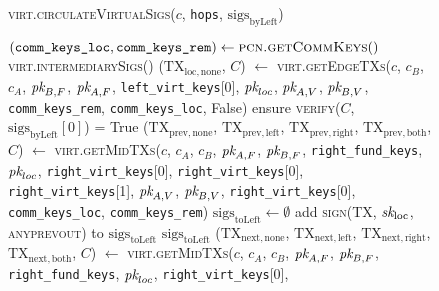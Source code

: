 \begin{figure}[H]
  \begin{processbox}{\textsc{virt.circulateVirtualSigs}($c$, \texttt{hops},
  $\mathrm{sigs}_{\mathrm{byLeft}}$)}
    \begin{algorithmic}[1]
      \State $(\texttt{comm\_keys\_loc}, \texttt{comm\_keys\_rem}) \gets
      \textsc{pcn.getCommKeys}()$
       
         
          \State \Return \textsc{virt.intermediarySigs}()
        \Else \: 
          \State ($\mathrm{TX}_{\mathrm{loc}, \mathrm{none}}$, $C$) $\gets$
          \textsc{virt.getEdgeTXs}($c$, $c_B$, $c_A$, $\textit{pk}_{B, F}$, $\textit{pk}_{A, F}$,
          \texttt{left\_virt\_keys}[0], $\textit{pk}_{loc}$, $\textit{pk}_{A, V}$, $\textit{pk}_{B, V}$,
          \texttt{comm\_keys\_rem}, \texttt{comm\_keys\_loc}, False)
          \State ensure \textsc{verify}($C$,
          $\mathrm{sigs}_{\mathrm{byLeft}}[0]$) = True
          \State ($\mathrm{TX}_{\mathrm{prev}, \mathrm{none}}$,
          $\mathrm{TX}_{\mathrm{prev}, \mathrm{left}}$,
          $\mathrm{TX}_{\mathrm{prev}, \mathrm{right}}$,
          $\mathrm{TX}_{\mathrm{prev}, \mathrm{both}}$, $C$) $\gets$
          \textsc{virt.getMidTXs}($c$, $c_A$, $c_B$, $\textit{pk}_{A, F}$, $\textit{pk}_{B, F}$,
          \texttt{right\_fund\_keys}, $\textit{pk}_{loc}$, \texttt{right\_virt\_keys}[0],
          \texttt{right\_virt\_keys}[0], \texttt{right\_virt\_keys}[1], $\textit{pk}_{A,
          V}$, $\textit{pk}_{B, V}$, \texttt{right\_virt\_keys}[0],
          \texttt{comm\_keys\_loc}, \texttt{comm\_keys\_rem})
          \State $\mathrm{sigs}_{\mathrm{toLeft}} \gets \emptyset$
            \State add \textsc{sign}(TX, $\textit{sk}_{\mathrm{loc}}$, \textsc{anyprevout})
            to $\mathrm{sigs}_{\mathrm{toLeft}}$
          \EndFor
          \State \Return $\mathrm{sigs}_{\mathrm{toLeft}}$
        \EndIf
      \Else \: 
        \State ($\mathrm{TX}_{\mathrm{next}, \mathrm{none}}$,
        $\mathrm{TX}_{\mathrm{next}, \mathrm{left}}$,
        $\mathrm{TX}_{\mathrm{next}, \mathrm{right}}$,
        $\mathrm{TX}_{\mathrm{next}, \mathrm{both}}$, $C$) $\gets$
        \textsc{virt.getMidTXs}($c$, $c_A$, $c_B$, $\textit{pk}_{A, F}$, $\textit{pk}_{B, F}$,
        \texttt{right\_fund\_keys}, $\textit{pk}_{loc}$, \texttt{right\_virt\_keys}[0],

\end{algorithmic}
\end{processbox}
\end{figure}
